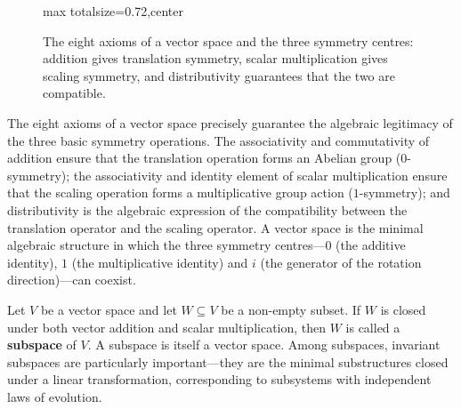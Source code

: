 \begin{figure}[htbp]
\centering
\begin{adjustbox}{max totalsize={\linewidth}{0.72\textheight},center}
\end{adjustbox}
\caption{The eight axioms of a vector space and the three symmetry centres: addition gives translation symmetry, scalar multiplication gives scaling symmetry, and distributivity guarantees that the two are compatible.}
\label{fig:vector_space_axioms}
\end{figure}

\begin{remark}\label{rem:vector_space_symmetry}
The eight axioms of a vector space precisely guarantee the algebraic legitimacy of the three basic symmetry operations. The associativity and commutativity of addition ensure that the translation operation forms an Abelian group ($0$-symmetry); the associativity and identity element of scalar multiplication ensure that the scaling operation forms a multiplicative group action ($1$-symmetry); and distributivity is the algebraic expression of the compatibility between the translation operator and the scaling operator. A vector space is the minimal algebraic structure in which the three symmetry centres---$0$ (the additive identity), $1$ (the multiplicative identity) and $i$ (the generator of the rotation direction)---can coexist.
\end{remark}

\begin{definition}[Subspace]\label{def:subspace}
Let $V$ be a vector space and let $W \subseteq V$ be a non-empty subset. If $W$ is closed under both vector addition and scalar multiplication, then $W$ is called a \textbf{subspace} of $V$. A subspace is itself a vector space. Among subspaces, invariant subspaces are particularly important---they are the minimal substructures closed under a linear transformation, corresponding to subsystems with independent laws of evolution.
\end{definition}

